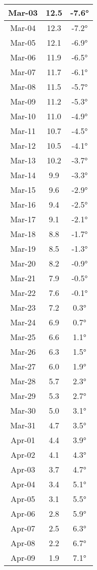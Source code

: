 \begin{footnotesize}
\begin{minipage}{0.33\textwidth}
\begin{tabular}[t]{c | c | c }
Mar-03 & 12.5 & -7.6°\\\hline
Mar-04 & 12.3 & -7.2°\\\hline
Mar-05 & 12.1 & -6.9°\\\hline
Mar-06 & 11.9 & -6.5°\\\hline
Mar-07 & 11.7 & -6.1°\\\hline
Mar-08 & 11.5 & -5.7°\\\hline
Mar-09 & 11.2 & -5.3°\\\hline
Mar-10 & 11.0 & -4.9°\\\hline
Mar-11 & 10.7 & -4.5°\\\hline
Mar-12 & 10.5 & -4.1°\\\hline
Mar-13 & 10.2 & -3.7°\\\hline
Mar-14 & 9.9 & -3.3°\\\hline
Mar-15 & 9.6 & -2.9°\\\hline
Mar-16 & 9.4 & -2.5°\\\hline
Mar-17 & 9.1 & -2.1°\\\hline
Mar-18 & 8.8 & -1.7°\\\hline
Mar-19 & 8.5 & -1.3°\\\hline
Mar-20 & 8.2 & -0.9°\\\hline
Mar-21 & 7.9 & -0.5°\\\hline
Mar-22 & 7.6 & -0.1°\\\hline
Mar-23 & 7.2 & 0.3°\\\hline
Mar-24 & 6.9 & 0.7°\\\hline
Mar-25 & 6.6 & 1.1°\\\hline
Mar-26 & 6.3 & 1.5°\\\hline
Mar-27 & 6.0 & 1.9°\\\hline
Mar-28 & 5.7 & 2.3°\\\hline
Mar-29 & 5.3 & 2.7°\\\hline
Mar-30 & 5.0 & 3.1°\\\hline
Mar-31 & 4.7 & 3.5°\\\hline
Apr-01 & 4.4 & 3.9°\\\hline
Apr-02 & 4.1 & 4.3°\\\hline
Apr-03 & 3.7 & 4.7°\\\hline
Apr-04 & 3.4 & 5.1°\\\hline
Apr-05 & 3.1 & 5.5°\\\hline
Apr-06 & 2.8 & 5.9°\\\hline
Apr-07 & 2.5 & 6.3°\\\hline
Apr-08 & 2.2 & 6.7°\\\hline
Apr-09 & 1.9 & 7.1°\\\hline

\end{tabular}
\end{minipage}
\end{footnotesize}
